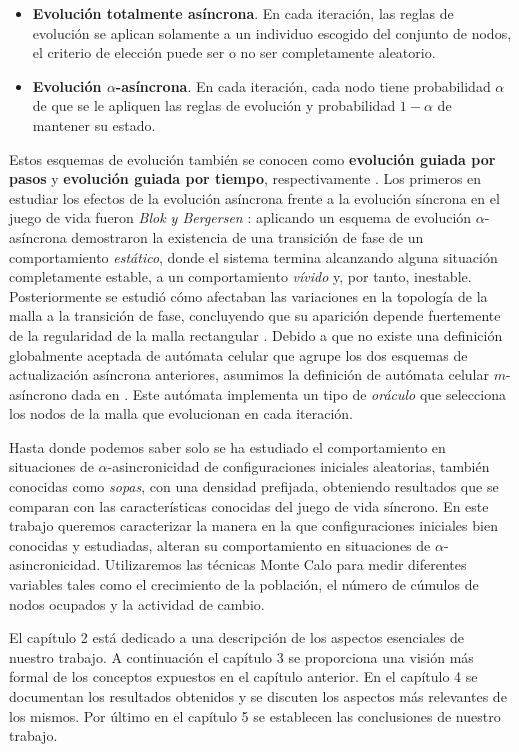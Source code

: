 \documentclass[../proyecto.tex]{book}
\begin{document}
\begin{itemize}
	\item \textbf{Evolución totalmente asíncrona}. En cada iteración, las reglas de evolución se aplican solamente a un individuo escogido del conjunto de nodos, el criterio de elección puede ser o no ser completamente aleatorio.
	\item \textbf{Evolución $\alpha$-asíncrona}. En cada iteración, cada nodo tiene probabilidad $\alpha$ de que se le apliquen las reglas de evolución y probabilidad $1-\alpha$ de mantener su estado.
\end{itemize}

Estos esquemas de evolución también se conocen como \textbf{evolución guiada por pasos} y \textbf{evolución guiada por tiempo}, respectivamente \cite{aka}. Los primeros en estudiar los efectos de la evolución asíncrona frente a la evolución síncrona en el juego de vida fueron \textit{Blok y Bergersen} \cite{syncVSasync}: aplicando un esquema de evolución $\alpha$-asíncrona demostraron la existencia de una transición de fase de un comportamiento \textit{estático}, donde el sistema termina alcanzando alguna situación completamente estable, a un comportamiento \textit{vívido} y, por tanto, inestable. Posteriormente se estudió cómo afectaban las variaciones en la topología de la malla a la transición de fase, concluyendo que su aparición depende fuertemente de la regularidad de la malla rectangular \cite{mallaIrregular}. Debido a que no existe una definición globalmente aceptada de autómata celular que agrupe los dos esquemas de actualización asíncrona anteriores, asumimos la definición de autómata celular $m$-asíncrono dada en \cite{oraculo}. Este autómata implementa un tipo de \textit{oráculo} que selecciona los nodos de la malla que evolucionan en cada iteración. 

Hasta donde podemos saber solo se ha estudiado el comportamiento en situaciones de $\alpha$-asincronicidad de configuraciones iniciales aleatorias, también conocidas como \textit{sopas}, con una densidad prefijada, obteniendo resultados que se comparan con las características conocidas del juego de vida síncrono. En este trabajo queremos caracterizar la manera en la que configuraciones iniciales bien conocidas y estudiadas, alteran su comportamiento en situaciones de $\alpha$-asincronicidad. Utilizaremos las técnicas Monte Calo para medir diferentes variables tales como el crecimiento de la población, el número de cúmulos de nodos ocupados y la actividad de cambio.

El capítulo 2 está dedicado a una descripción de los aspectos esenciales de nuestro trabajo. A continuación el capítulo 3 se proporciona una visión más formal de los conceptos expuestos en el capítulo anterior. En el capítulo 4 se documentan los resultados obtenidos y se discuten los aspectos más relevantes de los mismos. Por último en el capítulo 5 se establecen las conclusiones de nuestro trabajo. 
\end{document}
